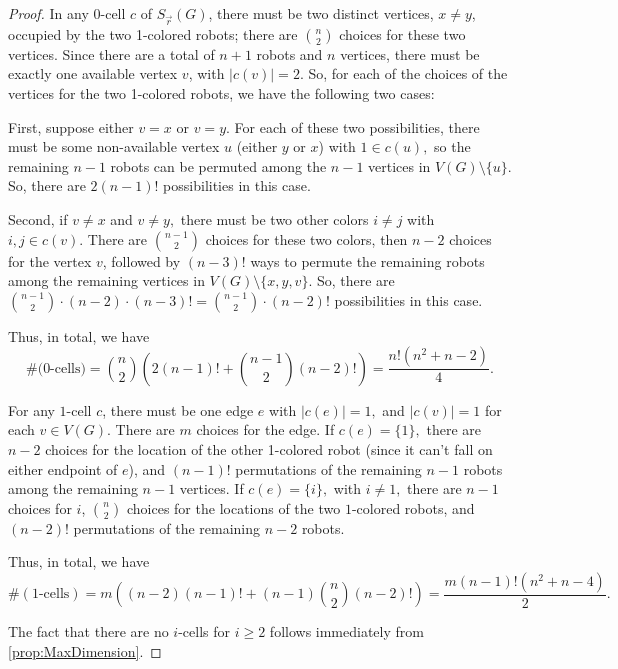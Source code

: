 \documentclass{amsart}
\newcommand{\Sr}{S_{\vec{r}}}
\newcommand{\Z}{\mathbb{Z}}
\newtheorem{thm}{Theorem}[section]
\theoremstyle{definition}
\theoremstyle{remark}
\begin{document}

\begin{proof}
    In any 0-cell $c$ of $\Sr(G)$, there must be two distinct vertices, $x\ne y$, occupied by the two 1-colored robots; there are $\binom{n}{2}$ choices for these two vertices. Since there are a total of $n+1$ robots and $n$ vertices, there must be exactly one available vertex $v$, with $|c(v)|=2.$ So, for each of the choices of the vertices for the two 1-colored robots, we have the following two cases:
    
    First, suppose either $v=x$ or $v=y$. For each of these two possibilities, there must be some non-available vertex $u$ (either $y$ or $x$) with $1\in c(u),$ so the remaining $n-1$ robots can be permuted among the $n-1$ vertices in $V(G)\setminus\{u\}$. So, there are $2(n-1)!$ possibilities in this case.
    
    Second, if $v\ne x$ and $v\ne y,$ there must be two other colors $i\ne j$ with $i,j\in c(v).$ There are $\binom{n-1}{2}$ choices for these two colors, then $n-2$ choices for the vertex $v$, followed by $(n-3)!$ ways to permute the remaining robots among the remaining vertices in $V(G)\setminus\{x,y,v\}$. So, there are $\binom{n-1}{2}\cdot (n-2)\cdot(n-3)!=\binom{n-1}{2}\cdot (n-2)!$ possibilities in this case.

    Thus, in total, we have 
    \[
    \#(\text{0-cells)}=\binom{n}{2}\left(2(n-1)! +\binom{n-1}{2}(n-2)!\right)
    =\frac{n!(n^2+n-2)}{4}.
    \]

    For any $1$-cell $c$, there must be one edge $e$ with $|c(e)|=1,$ and $|c(v)|=1$ for each $v\in V(G).$ There are $m$ choices for the edge. If $c(e)=\{1\},$ there are $n-2$ choices for the location of the other 1-colored robot (since it can't fall on either endpoint of $e$), and $(n-1)!$ permutations of the remaining $n-1$ robots among the remaining $n-1$ vertices. If $c(e)=\{i\},$ with $i\ne 1,$ there are $n-1$ choices for $i$,  $\binom{n}{2}$ choices for the locations of the two $1$-colored robots, and $(n-2)!$ permutations of the remaining $n-2$ robots.
    
    Thus, in total, we have 
    \[
    \#(\text{1-cells})=m\left((n-2)(n-1)!+(n-1)\binom{n}{2}(n-2)!\right)=\frac{m(n-1)!(n^2+n-4)}{2}.
    \]

    The fact that there are no $i$-cells for $i\ge 2$ follows immediately from \cref{prop:MaxDimension}.
\end{proof}
\end{document}
